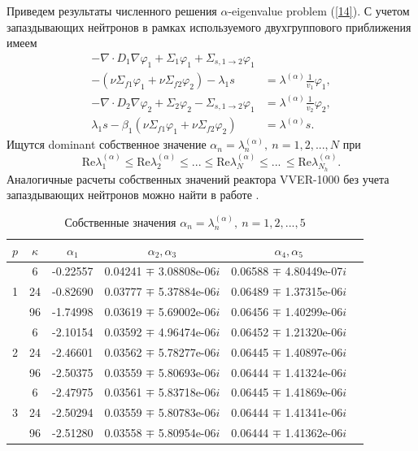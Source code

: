 \documentclass[authoryear]{elsarticle}
\begin{document}
Приведем результаты численного решения $\alpha$-eigenvalue problem (\ref{14}). 
С учетом запаздывающих нейтронов 
в рамках используемого двухгруппового приближения имеем 
\begin{equation}\label{23}
\begin{split}
 - \nabla \cdot D_1 \nabla \varphi_1  + \Sigma_1 \varphi_1 + \Sigma_{s,1\rightarrow 2} \varphi_1  & \\
 - (\nu \Sigma_{f1} \varphi_1 + \nu \Sigma_{f2} \varphi_2) - \lambda_1 s & = \lambda^{(\alpha)} \frac{1}{v_1}   \varphi_1, \\
 - \nabla \cdot D_2 \nabla \varphi_2  + \Sigma_2 \varphi_2  - \Sigma_{s,1\rightarrow 2} \varphi_1  
 & = \lambda^{(\alpha)} \frac{1}{v_2}   \varphi_2,\\
 \lambda_1 s - \beta_1(\nu \Sigma_{f1} \varphi_1 + \nu \Sigma_{f2} \varphi_2) & = \lambda^{(\alpha)} s. 
\end{split}
\end{equation} 
Ищутся dominant собственное значение $\alpha_n = \lambda_n^{(\alpha)}, \ n = 1,2, ..., N$ при
\[
 \mathrm{Re}  \lambda_1^{(\alpha)} \leq  \mathrm{Re}  \lambda_2^{(\alpha)} \leq ... 
 \leq \mathrm{Re}  \lambda_N^{(\alpha)} \leq ...\, \leq \mathrm{Re}  \lambda_{N_h}^{(\alpha)}.
\]
Аналогичные расчеты собственных значений реактора VVER-1000 без учета запаздывающих
нейтронов можно найти в работе \cite{avvakumov2017spectral}. 

\begin{table}[h]
\caption{Собственные значения $\alpha_n = \lambda_n^{(\alpha )}, \ n = 1,2, ..., 5$}
\label{t-2}
\begin{center}
\begin{tabular}{cccccc}
\hline
$p$ & $\kappa$ & $\alpha_1$ &  $\alpha_2, \alpha_3$ &  $\alpha_4, \alpha_5$ \\ 
\hline
& 6 & -0.22557  & 0.04241 $\mp$ 3.08808e-06$i$  & 0.06588 $\mp$ 4.80449e-07$i$  \\
1 & 24 & -0.82690  & 0.03777 $\mp$ 5.37884e-06$i$  & 0.06489 $\mp$ 1.37315e-06$i$ \\
& 96 & -1.74998  & 0.03619 $\mp$ 5.69002e-06$i$  & 0.06456 $\mp$ 1.40299e-06$i$ \\
\hline
& 6 & -2.10154  & 0.03592 $\mp$ 4.96474e-06$i$  & 0.06452 $\mp$ 1.21320e-06$i$ \\
2 & 24 & -2.46601  & 0.03562 $\mp$ 5.78277e-06$i$  & 0.06445 $\mp$ 1.40897e-06$i$ \\
& 96 & -2.50375  & 0.03559 $\mp$ 5.80693e-06$i$  & 0.06444 $\mp$ 1.41324e-06$i$ \\
\hline
& 6 & -2.47975  & 0.03561 $\mp$ 5.83718e-06$i$  & 0.06445 $\mp$ 1.41869e-06$i$ \\
3 & 24 & -2.50294  & 0.03559 $\mp$ 5.80783e-06$i$  & 0.06444 $\mp$ 1.41341e-06$i$ \\
& 96 & -2.51280  & 0.03558 $\mp$ 5.80954e-06$i$  & 0.06444 $\mp$ 1.41362e-06$i$ \\
\hline
\end{tabular}
\end{center}
\end{table}
\end{document}
